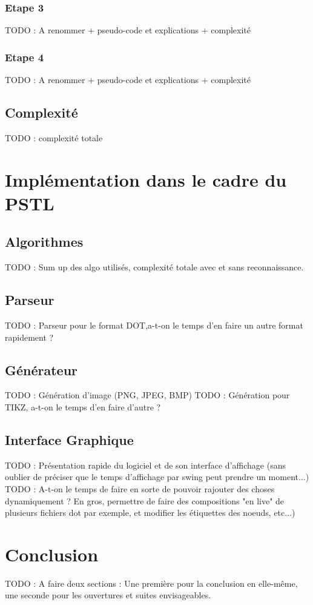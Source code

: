 \documentclass[11pt]{report}
\begin{document}
\subsection{Etape 3}
TODO : A renommer + pseudo-code et explications + complexité
\subsection{Etape 4}
TODO : A renommer + pseudo-code et explications + complexité
\section{Complexité}
TODO : complexité totale

\chapter{Implémentation dans le cadre du PSTL}
\section{Algorithmes}
TODO : Sum up des algo utilisés, complexité totale avec et sans reconnaissance.
\section{Parseur}
TODO : Parseur pour le format DOT,a-t-on le temps d'en faire un autre format rapidement ?
\section{Générateur}
TODO : Génération d'image (PNG, JPEG, BMP)
TODO : Génération pour TIKZ, a-t-on le temps d'en faire d'autre ?
\section{Interface Graphique}
TODO : Présentation rapide du logiciel et de son interface d'affichage (sans oublier de préciser que le temps d'affichage par swing peut prendre un moment...)
TODO : A-t-on le temps de faire en sorte de pouvoir rajouter des choses dynamiquement ? En gros, permettre de faire des compositions "en live" de plusieurs fichiers dot par exemple, et modifier les étiquettes des noeuds, etc...)
\chapter{Conclusion}
TODO : A faire deux sections : Une première pour la conclusion en elle-même, une seconde pour les ouvertures et suites envisageables.
\end{document}
